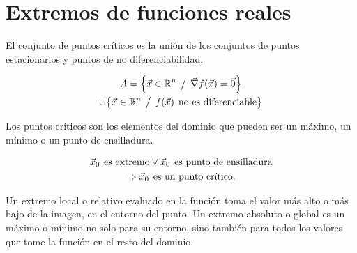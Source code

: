 \chapter{Extremos de funciones reales}

El conjunto de puntos críticos es la unión de los conjuntos de puntos estacionarios y puntos de no diferenciabilidad.

\begin{mdframed}[style=DefinitionFrame]
    \begin{defn}
    \end{defn}
    \begin{multline*}
        A = { \left\{ { \Vec{x} \in \mathbb{R}^n \hspace{1ex} \big/ \hspace{1ex} \Vec{\nabla} f(\Vec{x}) = \Vec{0} } \right\} }
        \\
        \cup { \left\{ { \Vec{x} \in \mathbb{R}^n\hspace{1ex} \big/ \hspace{1ex}f(\Vec{x}) \hspace{1ex} \textrm{no es diferenciable} } \right\} }
    \end{multline*}
\end{mdframed}

Los puntos críticos son los elementos del dominio que pueden ser un máximo, un mínimo o un punto de ensilladura.

\begin{mdframed}[style=PropertyFrame]
    \begin{prop}
    \end{prop}
    \begin{gather*}
        \Vec{x}_0 \hspace{1ex} \textrm{es extremo} \lor \Vec{x}_0 \hspace{1ex} \textrm{es punto de ensilladura}
        \\
        \Rightarrow \Vec{x}_0 \hspace{1ex} \textrm{es un punto crítico.}
    \end{gather*}
\end{mdframed}

Un extremo local o relativo evaluado en la función toma el valor más alto o más bajo de la imagen, en el entorno del punto.
Un extremo absoluto o global es un máximo o mínimo no solo para su entorno, sino también para todos los valores que tome la función en el resto del dominio.


